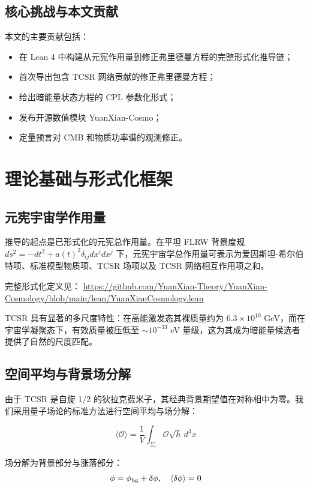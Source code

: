 \documentclass[12pt,a4paper]{ctexart}
\begin{document}
\subsection{核心挑战与本文贡献}

本文的主要贡献包括：
\begin{itemize}
    \item 在 Lean 4 中构建从元宪作用量到修正弗里德曼方程的完整形式化推导链；
    \item 首次导出包含 TCSR 网络贡献的修正弗里德曼方程；
    \item 给出暗能量状态方程的 CPL 参数化形式；
    \item 发布开源数值模块 YuanXian-Cosmo；
    \item 定量预言对 CMB 和物质功率谱的观测修正。
\end{itemize}

\section{理论基础与形式化框架}

\subsection{元宪宇宙学作用量}

推导的起点是已形式化的元宪总作用量。在平坦 FLRW 背景度规 $ds^2 = -dt^2 + a(t)^2 \delta_{ij} dx^i dx^j$ 下，元宪宇宙学总作用量可表示为爱因斯坦-希尔伯特项、标准模型物质项、TCSR 场项以及 TCSR 网络相互作用项之和。

完整形式化定义见：
\url{https://github.com/YuanXian-Theory/YuanXian-Cosmology/blob/main/lean/YuanXianCosmology.lean}

TCSR 具有显著的多尺度特性：在高能激发态其裸质量约为 $6.3 \times 10^{10}$ GeV，而在宇宙学凝聚态下，有效质量被压低至 $\sim 10^{-33}$ eV 量级，这为其成为暗能量候选者提供了自然的尺度匹配。

\subsection{空间平均与背景场分解}

由于 TCSR 是自旋 1/2 的狄拉克费米子，其经典背景期望值在对称相中为零。我们采用量子场论的标准方法进行空间平均与场分解：

\[
\langle \mathcal{O} \rangle = \frac{1}{V} \int_{\Sigma_t} \mathcal{O} \sqrt{h} \, d^3x
\]

场分解为背景部分与涨落部分：
\[
\phi = \phi_{\rm bg} + \delta\phi, \quad \langle \delta\phi \rangle = 0
\]
\end{document}
